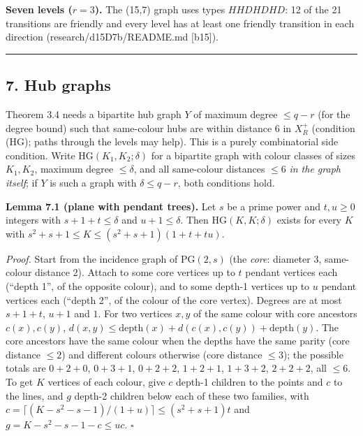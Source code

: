 \documentclass[
  11pt,
]{article}
\begin{document}
\textbf{Seven levels (\(r = 3\)).} The (15,7) graph uses types \(HHDHDHD\): 12 of the 21 transitions are friendly and
every level has at least one friendly transition in each direction (research/d15D7b/README.md {[}b15{]}).

\begin{center}\rule{0.5\linewidth}{0.5pt}\end{center}

\hypertarget{hub-graphs}{%
\subsection{7. Hub graphs}\label{hub-graphs}}

Theorem 3.4 needs a bipartite hub graph \(Y\) of maximum degree \(\le q-r\) (for the degree bound) such that same-colour
hubs are within distance 6 in \(X_R^+\) (condition (HG); paths through the levels may help). This is a purely
combinatorial side condition. Write \(\mathrm{HG}(K_1,K_2;\delta)\) for a bipartite graph with colour classes of sizes
\(K_1, K_2\), maximum degree \(\le\delta\), and all same-colour distances \(\le 6\) \emph{in the graph itself}; if \(Y\)
is such a graph with \(\delta\le q-r\), both conditions hold.

\textbf{Lemma 7.1 (plane with pendant trees).} Let \(s\) be a prime power and \(t, u\ge 0\) integers with
\(s+1+t\le\delta\) and \(u+1\le\delta\). Then \(\mathrm{HG}(K,K;\delta)\) exists for every \(K\) with
\(s^2+s+1\le K\le (s^2+s+1)(1+t+tu)\).

\emph{Proof.} Start from the incidence graph of \(\mathrm{PG}(2,s)\) (the \emph{core}: diameter 3, same-colour distance
2). Attach to some core vertices up to \(t\) pendant vertices each (``depth 1'', of the opposite colour), and to some
depth-1 vertices up to \(u\) pendant vertices each (``depth 2'', of the colour of the core vertex). Degrees are at most
\(s+1+t\), \(u+1\) and \(1\). For two vertices \(x, y\) of the same colour with core ancestors \(c(x), c(y)\),
\(d(x,y)\le \mathrm{depth}(x)+d(c(x),c(y))+\mathrm{depth}(y)\). The core ancestors have the same colour when the depths
have the same parity (core distance \(\le 2\)) and different colours otherwise (core distance \(\le 3\)); the possible
totals are \(0+2+0\), \(0+3+1\), \(0+2+2\), \(1+2+1\), \(1+3+2\), \(2+2+2\), all \(\le 6\). To get \(K\) vertices of
each colour, give \(c\) depth-1 children to the points and \(c\) to the lines, and \(g\) depth-2 children below each of
these two families, with \(c = \lceil (K-s^2-s-1)/(1+u)\rceil\le (s^2+s+1)t\) and \(g = K-s^2-s-1-c\le uc\). \(\square\)
\end{document}
